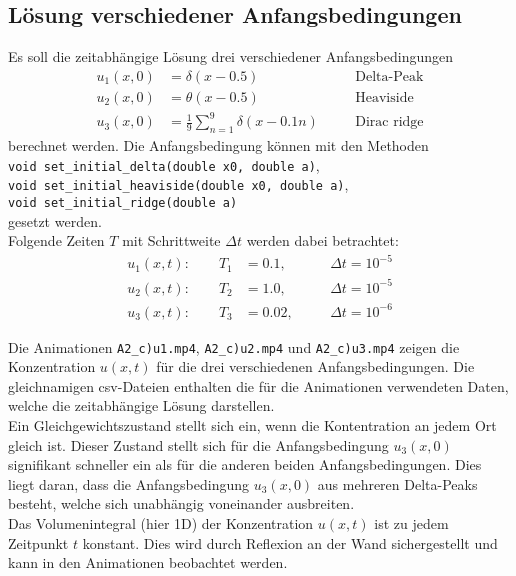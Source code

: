 \subsection{Lösung verschiedener Anfangsbedingungen}
Es soll die zeitabhängige Lösung drei verschiedener Anfangsbedingungen
\begin{align}
    u_1(x,0) &= \delta(x-0.5) && \quad \text{Delta-Peak}\\
    u_2(x,0) &= \theta(x-0.5) && \quad \text{Heaviside}\\
    u_3(x,0) &= \frac{1}{9} \sum_{n=1}^{9} \delta(x-0.1n) && \quad \text{Dirac ridge}
\end{align}
berechnet werden.
Die Anfangsbedingung können mit den Methoden \\
\texttt{void set\_initial\_delta(double x0, double a)}, \\
\texttt{void set\_initial\_heaviside(double x0, double a)}, \\
\texttt{void set\_initial\_ridge(double a)} \\
gesetzt werden.
\\
Folgende Zeiten $T$ mit Schrittweite $\Delta t$ werden dabei betrachtet:
\begin{align*}
    u_1(x,t): \qquad T_1 &= 0.1, && \quad \Delta t = 10^{-5}\\
    u_2(x,t): \qquad T_2 &= 1.0, && \quad \Delta t = 10^{-5}\\
    u_3(x,t): \qquad T_3 &= 0.02, && \quad \Delta t = 10^{-6}
\end{align*}

Die Animationen \texttt{A2\_c)u1.mp4}, \texttt{A2\_c)u2.mp4} und \texttt{A2\_c)u3.mp4} zeigen die Konzentration $u(x,t)$ für die drei verschiedenen Anfangsbedingungen.
Die gleichnamigen csv-Dateien enthalten die für die Animationen verwendeten Daten, welche die zeitabhängige Lösung darstellen.
\\
Ein Gleichgewichtszustand stellt sich ein, wenn die Kontentration an jedem Ort gleich ist.
Dieser Zustand stellt sich für die Anfangsbedingung $u_3(x,0)$ signifikant schneller ein als für die anderen beiden Anfangsbedingungen.
Dies liegt daran, dass die Anfangsbedingung $u_3(x,0)$ aus mehreren Delta-Peaks besteht, welche sich unabhängig voneinander ausbreiten.
\\
Das Volumenintegral (hier 1D) der Konzentration $u(x,t)$ ist zu jedem Zeitpunkt $t$ konstant.
Dies wird durch Reflexion an der Wand sichergestellt und kann in den Animationen beobachtet werden.
